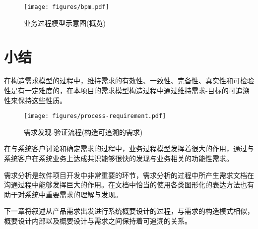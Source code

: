 \begin{figure}[!hbp]
  \begin{center}
    \texttt{[image: figures/bpm.pdf]}
    \caption{业务过程模型示意图(概览)\label{BPMOverview}}
  \end{center}
\end{figure}

\section{小结}

在构造需求模型的过程中，维持需求的有效性、一致性、完备性、真实性和可检验性是有一定难度的，在本项目的需求模型构造过程中通过维持需求-目标的可追溯性来保持这些性质。

\begin{figure}[!hbp]
  \begin{center}
    \texttt{[image: figures/process-requirement.pdf]}
    \caption{需求发现-验证流程(构造可追溯的需求)\label{RequirementExtraction}}
  \end{center}
\end{figure}

在与系统客户讨论和确定需求的过程中，业务过程模型发挥着很大的作用，通过与系统客户在系统业务上达成共识能够很快的发现与业务相关的功能性需求。

需求分析是软件项目开发中非常重要的环节，需求分析的过程中所产生需求文档在沟通过程中能够发挥巨大的作用。在文档中恰当的使用各类图形化的表达方法也有助于对系统中重要需求的理解与发现。

下一章将叙述从产品需求出发进行系统概要设计的过程，与需求的构造模式相似，概要设计内部以及概要设计与需求之间保持着可追溯的关系。

